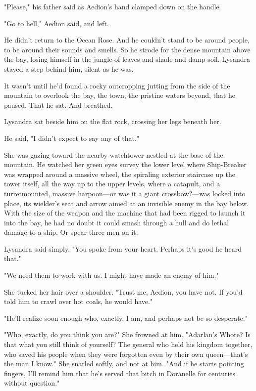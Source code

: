 "Please," his father said as Aedion's hand clamped down on the handle.

"Go to hell," Aedion said, and left.

He didn't return to the Ocean Rose. And he couldn't stand to be around people, to be around their sounds and smells. So he strode for the dense mountain above the bay, losing himself in the jungle of leaves and shade and damp soil. Lysandra stayed a step behind him, silent as he was.

It wasn't until he'd found a rocky outcropping jutting from the side of the mountain to overlook the bay, the town, the pristine waters beyond, that he paused. That he sat. And breathed.

Lysandra sat beside him on the flat rock, crossing her legs beneath her.

He said, "I didn't expect to say any of that."

She was gazing toward the nearby watchtower nestled at the base of the mountain. He watched her green eyes survey the lower level where Ship-Breaker was wrapped around a massive wheel, the spiraling exterior staircase up the tower itself, all the way up to the upper levels, where a catapult, and a turretmounted, massive harpoon---or was it a giant crossbow?---was locked into place, its wielder's seat and arrow aimed at an invisible enemy in the bay below. With the size of the weapon and the machine that had been rigged to launch it into the bay, he had no doubt it could smash through a hull and do lethal damage to a ship. Or spear three men on it.

Lysandra said simply, "You spoke from your heart. Perhaps it's good he heard that."

"We need them to work with us. I might have made an enemy of him."

She tucked her hair over a shoulder. "Trust me, Aedion, you have not. If you'd told him to crawl over hot coals, he would have."

"He'll realize soon enough who, exactly, I am, and perhaps not be so desperate."

"Who, exactly, do you think you are?" She frowned at him. "Adarlan's Whore? Is that what you still think of yourself? The general who held his kingdom together, who saved his people when they were forgotten even by their own queen---that's the man I know." She snarled softly, and not at him. "And if he starts pointing fingers, I'll remind him that he's served that bitch in Doranelle for centuries without question."

